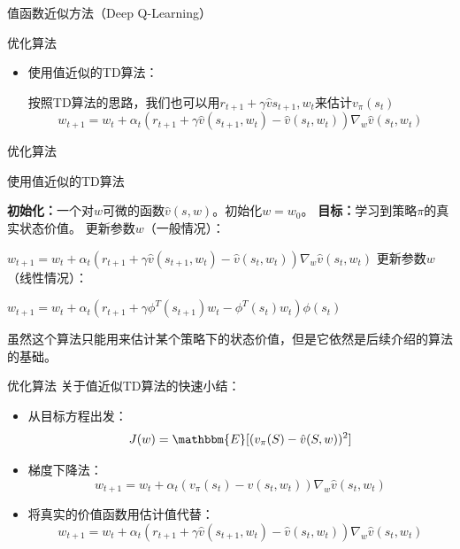 \begin{section}{值函数近似方法\alert{（Deep Q-Learning）}}
\begin{frame}{优化算法}
\begin{itemize}
        令$g_t$为从$s_t$出发的轨迹的折扣回报。那么$g_t$就可以用来估计$v_\pi(s_t)$。
        \[
            w_{t+1}=w_t+\alpha_t(g_t-\hat{v}(s_t,w_t))\nabla_w\hat{v}(s_t,w_t)
        \]
        \item 使用值近似的TD算法：
        
        按照TD算法的思路，我们也可以用$r_{t+1}+\gamma \hat{v}{s_{t+1},w_t}$来估计$v_\pi(s_t)$
        \[
            w_{t+1}=w_t+\alpha_t(r_{t+1}+\gamma \hat{v}(s_{t+1},w_t)-\hat{v}(s_t,w_t))\nabla_w\hat{v}(s_t,w_t)
        \]
    \end{itemize}
\end{frame}

\begin{frame}{优化算法}
    \begin{block}{使用值近似的TD算法}
        \begin{algorithmic}[1]
            \State \textbf{初始化：}一个对$w$可微的函数$\hat{v}(s,w)$。初始化$w=w_0$。
            \State \textbf{目标：}学习到策略$\pi$的真实状态价值。
                    \State 更新参数$w$（一般情况）：

                    $w_{t+1}=w_t+\alpha_t(r_{t+1}+\gamma \hat{v}(s_{t+1},w_t)-\hat{v}(s_t,w_t))\nabla_w\hat{v}(s_t,w_t)$
                    \State 更新参数$w$（线性情况）：

                    $w_{t+1}=w_t+\alpha_t(r_{t+1}+\gamma \phi^T(s_{t+1})w_t-\phi^T(s_t)w_t)\phi(s_t)$
                \EndFor
            \EndFor
        \end{algorithmic}
    \end{block}
    虽然这个算法只能用来估计某个策略下的状态价值，但是它依然是后续介绍的算法的基础。
\end{frame}

\begin{frame}{优化算法}
    关于值近似TD算法的快速小结：
    \begin{itemize}
        \item[1）] 从目标方程出发：
        \[
            J(w)=\mathbbm{E}[(v_\pi(S)-\hat{v}(S,w))^2]
        \]
        \item[2）] 梯度下降法：
        \[
            w_{t+1}=w_t+\alpha_t(v_\pi(s_t)-\hat{v}(s_t,w_t))\nabla_w\hat{v}(s_t,w_t)
        \]
        \item[3）] 将真实的价值函数用估计值代替：  
        \[
            w_{t+1}=w_t+\alpha_t(r_{t+1}+\gamma \hat{v}(s_{t+1},w_t)-\hat{v}(s_t,w_t))\nabla_w\hat{v}(s_t,w_t)
        \]
    \end{itemize}
\end{frame}


\end{section}
